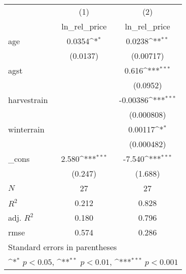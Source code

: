 {
\def\sym#1{\ifmmode^{#1}\else\(^{#1}\)\fi}
\begin{tabular}{l*{2}{c}}
\hline\hline
            &\multicolumn{1}{c}{(1)}&\multicolumn{1}{c}{(2)}\\
            &\multicolumn{1}{c}{ln\_rel\_price}&\multicolumn{1}{c}{ln\_rel\_price}\\
\hline
age         &      0.0354\sym{*}  &      0.0238\sym{**} \\
            &    (0.0137)         &   (0.00717)         \\
[1em]
agst        &                     &       0.616\sym{***}\\
            &                     &    (0.0952)         \\
[1em]
harvestrain &                     &    -0.00386\sym{***}\\
            &                     &  (0.000808)         \\
[1em]
winterrain  &                     &     0.00117\sym{*}  \\
            &                     &  (0.000482)         \\
[1em]
\_cons      &       2.580\sym{***}&      -7.540\sym{***}\\
            &     (0.247)         &     (1.688)         \\
\hline
\(N\)       &          27         &          27         \\
\(R^{2}\)   &       0.212         &       0.828         \\
adj. \(R^{2}\)&       0.180         &       0.796         \\
rmse        &       0.574         &       0.286         \\
\hline\hline
\multicolumn{3}{l}{\footnotesize Standard errors in parentheses}\\
\multicolumn{3}{l}{\footnotesize \sym{*} \(p<0.05\), \sym{**} \(p<0.01\), \sym{***} \(p<0.001\)}\\
\end{tabular}
}
